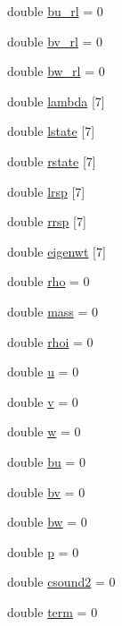 \begin{DoxyCompactItemize}
double \hyperlink{classRiemann_a83f1429336f5f23f125d97586d915669}{bu\+\_\+rl} = 0
\item 
double \hyperlink{classRiemann_afec414f0ed2e00806f66e3788bffa5bc}{bv\+\_\+rl} = 0
\item 
double \hyperlink{classRiemann_a495ec1a2fa4ec5ff276d11acf850b95f}{bw\+\_\+rl} = 0
\item 
double \hyperlink{classRiemann_a5075d160fbae78a0c6204385033f6891}{lambda} \mbox{[}7\mbox{]}
\item 
double \hyperlink{classRiemann_a96f646a8bc32309955dc55b81d209d3f}{lstate} \mbox{[}7\mbox{]}
\item 
double \hyperlink{classRiemann_a46044bb74c7273a552a16425b1ae4cb3}{rstate} \mbox{[}7\mbox{]}
\item 
double \hyperlink{classRiemann_a6fa975d17342f29096d3e11402b543be}{lrsp} \mbox{[}7\mbox{]}
\item 
double \hyperlink{classRiemann_adaf0219875f862407cddf578d361967c}{rrsp} \mbox{[}7\mbox{]}
\item 
double \hyperlink{classRiemann_a195eba0f8d56795aa8749baaba946d20}{eigenwt} \mbox{[}7\mbox{]}
\item 
double \hyperlink{classRiemann_a780005bbc3c529834bd7a1bc436528a2}{rho} = 0
\item 
double \hyperlink{classRiemann_a8997d6d8d411e369d4fd2a377335236e}{mass} = 0
\item 
double \hyperlink{classRiemann_a61a0bda4853dafde0aeb9501760e160e}{rhoi} = 0
\item 
double \hyperlink{classRiemann_a5c0e2b1271b3274db9fe756480cc4013}{u} = 0
\item 
double \hyperlink{classRiemann_a0d7d0e062aa88a8451187cc93420285a}{v} = 0
\item 
double \hyperlink{classRiemann_ac190f84c73f0feb3de1c841166037d39}{w} = 0
\item 
double \hyperlink{classRiemann_ae4c1b11cff0db529233ab87b0e333de5}{bu} = 0
\item 
double \hyperlink{classRiemann_ae2cd07b9d426b2e8346fa523a2691117}{bv} = 0
\item 
double \hyperlink{classRiemann_ad58f9d90cbfb3f6aad77e605ae771b25}{bw} = 0
\item 
double \hyperlink{classRiemann_ad5cdb1fbb2149bcbdbfea4591d235412}{p} = 0
\item 
double \hyperlink{classRiemann_a047523b191dec91d1903326106e2df57}{csound2} = 0
\item 
double \hyperlink{classRiemann_a70786d482bb4e5a4643411cd256c8bc9}{term} = 0

\end{DoxyCompactItemize}

